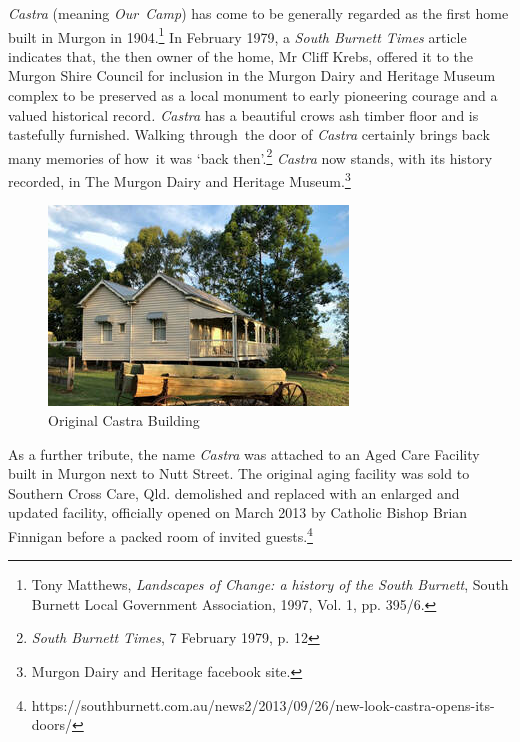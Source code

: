 \emph{Castra} (meaning \emph{Our~Camp}) has come to be generally regarded as the first home built in Murgon in 1904.\footnote{Tony Matthews, \emph{Landscapes of Change: a history of the South Burnett}, South Burnett Local Government Association, 1997, Vol. 1, pp. 395/6.} In February 1979, a \emph{South Burnett Times} article indicates that, the then owner of the home, Mr Cliff Krebs, offered it to the Murgon Shire Council for inclusion in the Murgon Dairy and Heritage Museum complex to be preserved as a local monument to early pioneering courage and a valued historical record\emph{. Castra} has a beautiful crows ash timber floor and is tastefully furnished. Walking through~the door of \emph{Castra} certainly brings back many memories of how~it was `back then'.\footnote{\emph{South Burnett Times}, 7 February 1979, p. 12} \emph{Castra} now stands, with its history recorded, in The Murgon Dairy and Heritage Museum.\footnote{Murgon Dairy and Heritage facebook site.}








\begin{figure}
\begin{center}
\includegraphics[width=1.\linewidth,center]{../images/castraOld.png}
\caption{Original Castra Building}
\end{center}
\end{figure}




As a further tribute, the name \emph{Castra} was attached to an Aged Care Facility built in Murgon next to Nutt Street. The original aging facility was sold to Southern Cross Care, Qld. demolished and replaced with an enlarged and updated facility, officially opened on March 2013 by Catholic Bishop Brian Finnigan before a packed room of invited guests.\footnote{https://southburnett.com.au/news2/2013/09/26/new-look-castra-opens-its-doors/}



